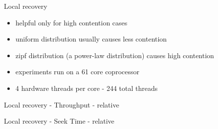 \begin{frame}{Local recovery}
\begin{itemize}
\item helpful only for high contention cases
\item uniform distribution usually causes less contention
\item zipf distribution (a power-law distribution) causes high contention
\item experiments run on a 61 core coprocessor
\item 4 hardware threads per core - 244 total threads
\end{itemize}
\end{frame}

\begin{frame}{Local recovery - Throughput - relative}

\end{frame}

\begin{frame}{Local recovery - Seek Time - relative}

\end{frame}